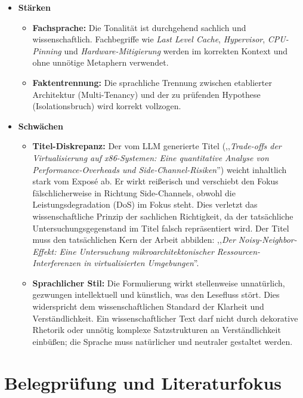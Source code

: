 \documentclass[
  11pt,
  a4paper,
  parskip=half         %
]{scrartcl}
\begin{document}
\begin{itemize}
  \item \textbf{Stärken}
  \begin{itemize}
    \item \textbf{Fachsprache:} Die Tonalität ist durchgehend sachlich und wissenschaftlich.
          Fachbegriffe wie \textit{Last Level Cache}, \textit{Hypervisor}, \textit{CPU-Pinning}
          und \textit{Hardware-Mitigierung} werden im korrekten Kontext und ohne unnötige
          Metaphern verwendet.
    \item \textbf{Faktentrennung:} Die sprachliche Trennung zwischen etablierter Architektur
          (Multi-Tenancy) und der zu prüfenden Hypothese (Isolationsbruch) wird korrekt vollzogen.
  \end{itemize}

  \item \textbf{Schwächen}
  \begin{itemize}
    \item \textbf{Titel-Diskrepanz:} Der vom LLM generierte Titel (,,\textit{Trade-offs der
          Virtualisierung auf x86-Systemen: Eine quantitative Analyse von Performance-Overheads
          und Side-Channel-Risiken}'') weicht inhaltlich stark vom Exposé ab. Er wirkt reißerisch
          und verschiebt den Fokus fälschlicherweise in Richtung Side-Channels, obwohl die
          Leistungsdegradation (DoS) im Fokus steht. Dies verletzt das wissenschaftliche Prinzip
          der sachlichen Richtigkeit, da der tatsächliche Untersuchungsgegenstand im Titel falsch
          repräsentiert wird. Der Titel muss den tatsächlichen Kern der Arbeit abbilden:
          ,,\textit{Der Noisy-Neighbor-Effekt: Eine Untersuchung mikroarchitektonischer
          Ressourcen-Interferenzen in virtualisierten Umgebungen}''.
    \item \textbf{Sprachlicher Stil:} Die Formulierung wirkt stellenweise unnatürlich, gezwungen
          intellektuell und künstlich, was den Lesefluss stört. Dies widerspricht dem
          wissenschaftlichen Standard der Klarheit und Verständlichkeit. Ein wissenschaftlicher Text
          darf nicht durch dekorative Rhetorik oder unnötig komplexe Satzstrukturen an Verständlichkeit
          einbüßen; die Sprache muss natürlicher und neutraler gestaltet werden.
  \end{itemize}
\end{itemize}

\section{Belegprüfung und Literaturfokus}
\end{document}
